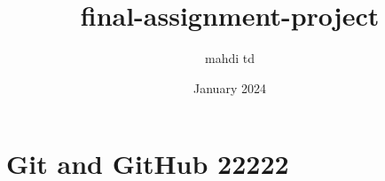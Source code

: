 \documentclass{article}
\title{final-assignment-project}
\author{mahdi td}
\date{January 2024}
\begin{document}
\maketitle
\newpage
\section{Git and GitHub 22222}
\end{document}

